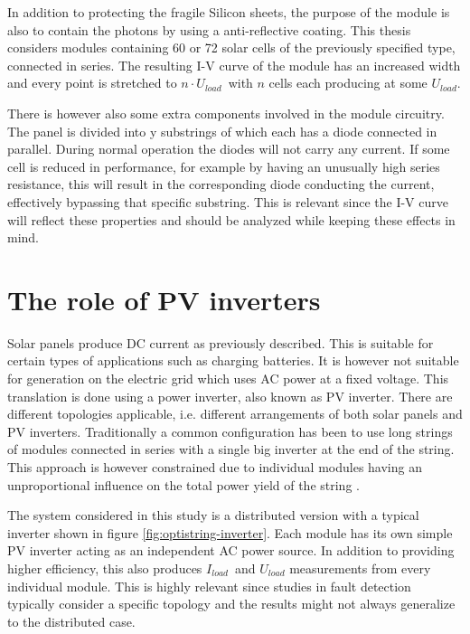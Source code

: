 
In addition to protecting the fragile Silicon sheets, the purpose of the module is also to contain the photons by using a anti-reflective coating.
This thesis considers modules containing 60 or 72 solar cells of the previously specified type, connected in series.
The resulting I-V curve of the module has an increased width and every point is stretched to $n \cdot U_{load}$ with $n$ cells each producing at some $U_{load}$.

There is however also some extra components involved in the module circuitry.
The panel is divided into y substrings of which each has a diode connected in parallel.
During normal operation the diodes will not carry any current.
If some cell is reduced in performance, for example by having an unusually high series resistance, this will result in the corresponding diode conducting the current, effectively bypassing that specific substring\cite{Roman2006}.
This is relevant since the I-V curve will reflect these properties and should be analyzed while keeping these effects in mind.

\section{The role of PV inverters}
Solar panels produce DC current as previously described.
This is suitable for certain types of applications such as charging batteries.
It is however not suitable for generation on the electric grid which uses AC power at a fixed voltage.
This translation is done using a power inverter, also known as PV inverter.
There are different topologies applicable, i.e. different arrangements of both solar panels and PV inverters.
Traditionally a common configuration has been to use long strings of modules connected in series with a single big inverter at the end of the string.
This approach is however constrained due to individual modules having an unproportional influence on the total power yield of the string \cite{Roman2006}.


The system considered in this study is a distributed version with a typical inverter shown in figure \ref{fig:optistring-inverter}.
Each module has its own simple PV inverter acting as an independent AC power source.
In addition to providing higher efficiency, this also produces $I_{load}$ and $U_{load}$ measurements from every individual module.
This is highly relevant since studies in fault detection typically consider a specific topology and the results might not always generalize to the distributed case.

